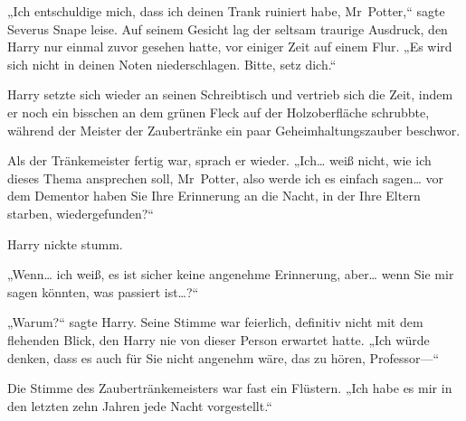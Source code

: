 „Ich entschuldige mich, dass ich deinen Trank ruiniert habe, Mr~Potter,“ sagte Severus Snape leise. Auf seinem Gesicht lag der seltsam traurige Ausdruck, den Harry nur einmal zuvor gesehen hatte, vor einiger Zeit auf einem Flur. „Es wird sich nicht in deinen Noten niederschlagen. Bitte, setz dich.“

Harry setzte sich wieder an seinen Schreibtisch und vertrieb sich die Zeit, indem er noch ein bisschen an dem grünen Fleck auf der Holzoberfläche schrubbte, während der Meister der Zaubertränke ein paar Geheimhaltungszauber beschwor.

Als der Tränkemeister fertig war, sprach er wieder.
„Ich… weiß nicht, wie ich dieses Thema ansprechen soll, Mr~Potter, also werde ich es einfach sagen… vor dem Dementor haben Sie Ihre Erinnerung an die Nacht, in der Ihre Eltern starben, wiedergefunden?“

Harry nickte stumm.

„Wenn… ich weiß, es ist sicher keine angenehme Erinnerung, aber… wenn Sie mir sagen könnten, was passiert ist…?“

„Warum?“ sagte Harry.
Seine Stimme war feierlich, definitiv nicht mit dem flehenden Blick, den Harry nie von dieser Person erwartet hatte.
„Ich würde denken, dass es auch für Sie nicht angenehm wäre, das zu hören, Professor—“

Die Stimme des Zaubertränkemeisters war fast ein Flüstern.
„Ich habe es mir in den letzten zehn Jahren jede Nacht vorgestellt.“

